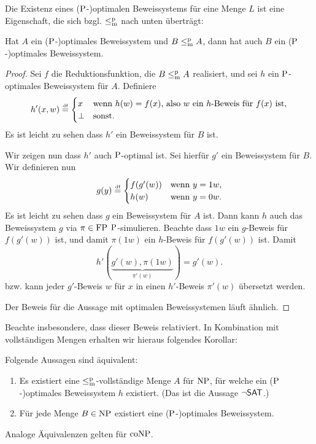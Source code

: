Die Existenz eines ($\P$-)optimalen Beweissystems für eine Menge $L$ ist eine Eigenschaft, die sich bzgl. $\leqmp$ nach unten überträgt:
\begin{lemma}\label{lemma:optimal-downward}
    Hat $A$ ein ($\P$-)optimales Beweissystem und $B\leqmp A$, dann hat auch $B$ ein ($\P$-)optimales Beweissystem.
\end{lemma}
\begin{proof}
    Sei $f$ die Reduktionsfunktion, die $B\leqmp A$ realisiert, und 
    sei $h$ ein $\P$-optimales Beweissystem für $A$. Definiere
    \[ h'(x,w) \defeq \begin{cases} x & \text{wenn $h(w)=f(x)$, also $w$ ein $h$-Beweis für $f(x)$ ist},\\ \bot & \text{sonst.} \end{cases} \]
    Es ist leicht zu sehen dass $h'$ ein Beweissystem für $B$ ist.

    Wir zeigen nun dass $h'$ auch $\P$-optimal ist. Sei hierfür $g'$ ein Beweissystem für $B$. Wir definieren nun
    \[ g(y) \defeq \begin{cases} f(g'(w)) & \text{wenn $y=1w$,}\\ h(w) & \text{wenn $y=0w$.} \end{cases}\]
    Es ist leicht zu sehen dass $g$ ein Beweissystem für $A$ ist. Dann kann $h$ auch das Beweissystem $g$ via $\pi\in\FP$ $\P$-simulieren.
    Beachte dass $1w$ ein $g$-Beweis für $f(g'(w))$ ist, und damit $\pi(1w)$ ein $h$-Beweis für $f(g'(w))$ ist.
    Damit
    \[ h'(\underbrace{g'(w), \pi(1w)}_{\pi'(w)}) = g'(w). \]
    bzw. kann jeder $g'$-Beweis $w$ für $x$ in einen $h'$-Beweis $\pi'(w)$ übersetzt werden.

    Der Beweis für die Aussage mit optimalen Beweissystemen läuft ähnlich.
\end{proof}
Beachte insbesondere, dass dieser Beweis relativiert.
In Kombination mit vollständigen Mengen erhalten wir hieraus folgendes Korollar:
\begin{corollary}\label{cor:con-characterization}
    Folgende Aussagen sind äquivalent:
    \begin{enumerate}[endpenalty=10000]
        \item Es existiert eine $\leqmp$-vollständige Menge $A$ für $\NP$, für welche ein ($\P$-)optimales Beweissystem $h$ existiert. (Das ist die Aussage $\neg\hSAT$.)
        \item Für jede Menge $B\in\NP$ existiert eine ($\P$-)optimales Beweissystem.
    \end{enumerate}
    Analoge Äquivalenzen gelten für $\coNP$.
\end{corollary}
